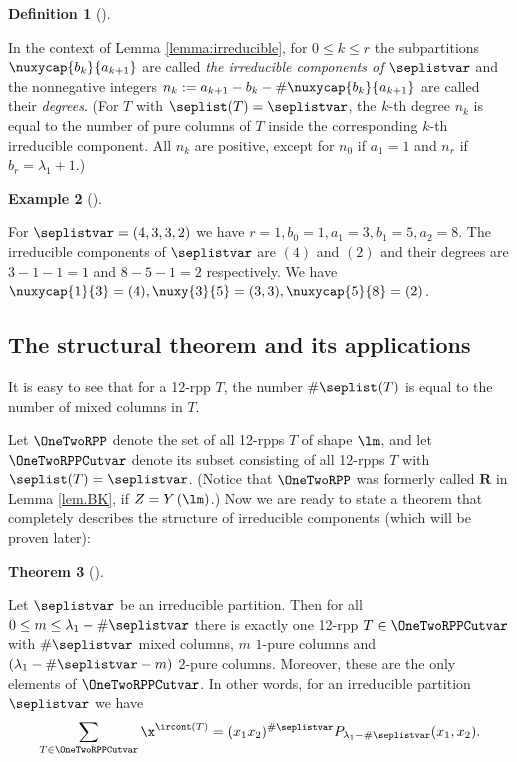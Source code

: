 \documentclass[numbers=enddot,12pt,final,onecolumn,notitlepage]{scrartcl}%
\theoremstyle{definition}
\newtheorem{theo}{Theorem}[section]
\newenvironment{theorem}[1][]
{\begin{theo}[#1]\begin{leftbar}}
{\end{leftbar}\end{theo}}
\newtheorem{defi}[theo]{Definition}
\newenvironment{definition}[1][]
{\begin{defi}[#1]\begin{leftbar}}
{\end{leftbar}\end{defi}}
\newtheorem{remk}[theo]{Remark}
\newenvironment{remark}[1][]
{\begin{remk}[#1]\begin{leftbar}}
{\end{leftbar}\end{remk}}
\newtheorem{exmp}[theo]{Example}
\newenvironment{example}[1][]
{\begin{exmp}[#1]\begin{leftbar}}
{\end{leftbar}\end{exmp}}
\let\sumnonlimits\sum
\renewcommand{\sum}{\sumnonlimits\limits}
\begin{document}
\begin{definition}
 
 In the context of Lemma \ref{lemma:irreducible}, for $0\leq k\leq r$ the subpartitions $\nuxycap{b_k}{a_{k+1}}$ are called \textit{the irreducible components of $\seplistvar$} and the nonnegative integers $n_k:=a_{k+1}-b_k-\#\nuxycap{b_k}{a_{k+1}}$ are called their \textit{degrees}. (For $T$ with $\seplist(T)=\seplistvar$, the $k$-th degree $n_k$ is equal to the number of pure columns of $T$ inside the corresponding $k$-th irreducible component. All $n_k$ are positive, except for $n_0$ if $a_1 = 1$ and $n_r$ if $b_r = \lambda_1 + 1$.)
\end{definition}

\begin{example}
 For $\seplistvar=(4,3,3,2)$ we have $r=1,b_0=1,a_1=3,b_1=5,a_2=8$. The irreducible components of $\seplistvar$ are $(4)$ and $(2)$ and their degrees are $3-1-1=1$ and $8-5-1=2$ respectively. We have $\nuxycap{1}{3}=(4),\nuxy{3}{5}=(3,3),\nuxycap{5}{8}=(2)$.
\end{example}


\subsection{The structural theorem and its applications}
It is easy to see that for a 12-rpp $T$, the number $\#\seplist(T)$ is equal to the number of mixed columns in $T$.

Let $\OneTwoRPP$ denote the set of all 12-rpps $T$ of shape $\lm$, and let $\OneTwoRPPCutvar$ denote its subset consisting of all 12-rpps $T$ with $\seplist(T)=\seplistvar$. (Notice that $\OneTwoRPP$ was formerly called $\mathbf{R}$ in Lemma \ref{lem.BK}, if $Z = Y\left(\lm\right)$.) Now we are ready to state a theorem that completely describes the structure of irreducible components (which will be proven later):
\begin{theorem}
\label{thm:12rpps}
 Let $\seplistvar$ be an irreducible partition. Then for all $0\leq m\leq \lambda_1-\#\seplistvar$ there is exactly one 12-rpp $T\in\OneTwoRPPCutvar$ with $\#\seplistvar$ mixed columns, $m$ $1$-pure columns and $(\lambda_1-\#\seplistvar-m)$ $2$-pure columns. Moreover, these are the only elements of $\OneTwoRPPCutvar$. In other words, for an irreducible partition $\seplistvar$ we have
  \begin{equation}
 \label{eq:thm12rpps}
 \sum_{T\in\OneTwoRPPCutvar} \x^{\ircont(T)}=(x_1x_2)^{\#\seplistvar} P_{\lambda_1-\#\seplistvar}(x_1,x_2).
 \end{equation}
\end{theorem}
\end{document}
